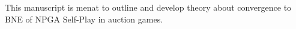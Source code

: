 %
%


This manuscript is menat to outline and develop theory about convergence to \ac{BNE} of NPGA Self-Play in auction games.